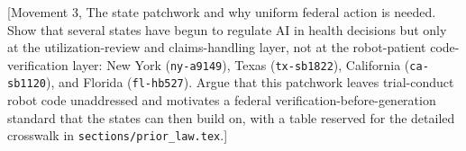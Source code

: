 [Movement 3, The state patchwork and why uniform federal action is needed. Show
that several states have begun to regulate AI in health decisions but only at the
utilization-review and claims-handling layer, not at the robot-patient code-
verification layer: New York (\texttt{ny-a9149}), Texas (\texttt{tx-sb1822}),
California (\texttt{ca-sb1120}), and Florida (\texttt{fl-hb527}). Argue that this
patchwork leaves trial-conduct robot code unaddressed and motivates a federal
verification-before-generation standard that the states can then build on, with a
table reserved for the detailed crosswalk in \texttt{sections/prior\_law.tex}.]


